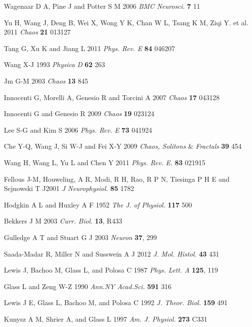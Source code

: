 \documentclass[twocolumn,showpacs,preprintnumbers,amsmath,amssymb,pre,superscriptaddress]{revtex4-1}
\begin{document}
\begin{CJK}{UTF8}{gbsn}
\begin{thebibliography}{999}
   Wagenaar D A, Pine J and Potter S M 2006 \textit{ BMC Neurosci.} \textbf{7} 11

 Yu H, Wang J, Deng B, Wei X, Wong Y K, Chan W L, Tsang K M, Ziqi Y. et al. 2011 \textit{Chaos} \textbf{21} 013127

   Tang G, Xu K and Jiang L 2011 \textit{Phys. Rev. E} \textbf{84} 046207

   Wang X-J 1993 \textit{Physica D} \textbf{62} 263

   Jm G-M 2003 \textit{Chaos} \textbf{13} 845

   Innocenti G, Morelli A, Genesio R and Torcini A 2007 \textit{Chaos} \textbf{17} 043128

   Innocenti G and Genesio R 2009 \textit{Chaos} \textbf{19} 023124

  Lee S-G and Kim S 2006 \textit{Phys. Rev. E} \textbf{73} 041924

   Che Y-Q, Wang J, Si W-J and Fei X-Y 2009 \textit{Chaos, Solitons} \& \textit{Fractals} \textbf{39} 454

 Wang H, Wang L, Yu L and Chen Y 2011 \textit{Phys. Rev. E.} \textbf{83} 021915

 Fellous J-M, Houweling, A R, Modi, R H, Rao, R P N, Tiesinga P H E and Sejnowski T J2001 \textit{J Neurophysiol.} \textbf{85} 1782 

 Hodgkin A L and Huxley A F 1952 \textit{The J. of Physiol. } \textbf{117} 500


Bekkers J M 2003  \textit{Curr. Biol.} \textbf{13}, R433

Gulledge A T  and Stuart G J 2003 \textit{Neuron} \textbf{37}, 299

Saada-Madar R, Miller N and  Susswein A J 2012 \textit{J. Mol. Histol.} \textbf{43} 431

 Lewis J, Bachoo M, Glass L, and Polosa C 1987 \textit{Phys. Lett. A } \textbf{125}, 119 
 
 Glass L and Zeng W-Z 1990 \textit{Ann.NY Acad.Sci. } \textbf{591}  316

 Lewis J E, Glass L, Bachoo M, and Polosa C 1992 \textit{J. Theor. Biol.} \textbf{159} 491

 Kunysz A M, Shrier A, and Glass L 1997 \textit{Am. J. Physiol.} \textbf{273} C331



\end{thebibliography}
\end{CJK}
\end{document}
